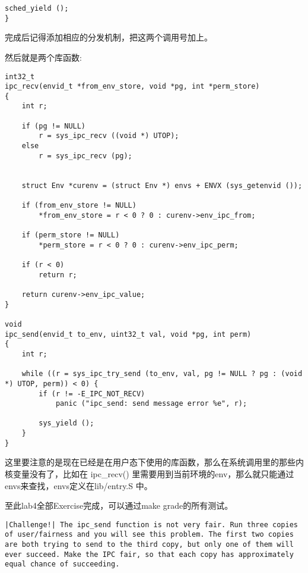 \documentclass{article}
\newcommand{\funcname}[1]{{\ttfamily \small #1}}
\begin{document}
\begin{CJK*}{UTF8}{gkai}
\begin{lstlisting}[style=ccode, title={\scriptsize \ttfamily \bfseries kern/syscall.c}]
    sched_yield ();
}
\end{lstlisting}

完成后记得添加相应的分发机制，把这两个调用号加上。

\vspace{2em}

然后就是两个库函数:

\begin{lstlisting}[style=ccode, title={\scriptsize \ttfamily \bfseries lib/ipc.c}]
int32_t
ipc_recv(envid_t *from_env_store, void *pg, int *perm_store)
{
    int r;
    
    if (pg != NULL)
        r = sys_ipc_recv ((void *) UTOP);
    else
        r = sys_ipc_recv (pg);


    struct Env *curenv = (struct Env *) envs + ENVX (sys_getenvid ());

    if (from_env_store != NULL)
        *from_env_store = r < 0 ? 0 : curenv->env_ipc_from;

    if (perm_store != NULL)
        *perm_store = r < 0 ? 0 : curenv->env_ipc_perm;

    if (r < 0)
        return r;

	return curenv->env_ipc_value;
}

void
ipc_send(envid_t to_env, uint32_t val, void *pg, int perm)
{
    int r;

    while ((r = sys_ipc_try_send (to_env, val, pg != NULL ? pg : (void *) UTOP, perm)) < 0) {    
        if (r != -E_IPC_NOT_RECV)
            panic ("ipc_send: send message error %e", r);

        sys_yield ();
    }
}
\end{lstlisting}

这里要注意的是现在已经是在用户态下使用的库函数，那么在系统调用里的那些内核变量没有了，比如在 \funcname{ipc\_recv()} 里需要用到当前环境的env，那么就只能通过envs来查找，envs定义在lib/entry.S 中。

\vspace{2em}

至此lab4全部Exercise完成，可以通过make grade的所有测试。


\begin{lstlisting}[style=challenge]
|Challenge!| The ipc_send function is not very fair. Run three copies of user/fairness and you will see this problem. The first two copies are both trying to send to the third copy, but only one of them will ever succeed. Make the IPC fair, so that each copy has approximately equal chance of succeeding.
\end{lstlisting}


\end{CJK*}
\end{document}
